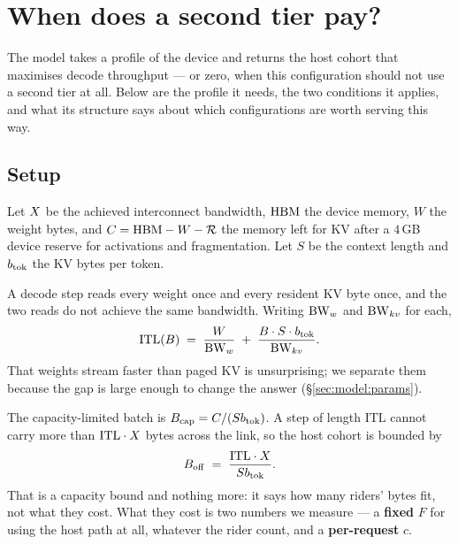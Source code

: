 %

\section{When does a second tier pay?}
\label{sec:model}

The model takes a profile of the device and returns the host cohort that maximises
decode throughput --- or zero, when this configuration should not use a second tier
at all. Below are the profile it needs, the two conditions it applies, and what its
structure says about which configurations are worth serving this way.

\subsection{Setup}

Let $X$ be the achieved interconnect bandwidth, $\mathrm{HBM}$ the device memory, $W$
the weight bytes, and $C = \mathrm{HBM} - W - \mathcal{R}$ the memory left for KV after a
$4$\,GB device reserve for activations and fragmentation. Let $S$ be the context
length and $b_{\mathrm{tok}}$ the KV bytes per token.

A decode step reads every weight once and every resident KV byte once, and the two
reads do not achieve the same bandwidth. Writing $\mathrm{BW}_w$ and $\mathrm{BW}_{kv}$ for each,
%
\begin{equation}
\label{eq:step}
\mathrm{ITL}(B) \;=\; \frac{W}{\mathrm{BW}_w} \;+\; \frac{B \cdot S \cdot b_{\mathrm{tok}}}{\mathrm{BW}_{kv}}.
\end{equation}
%
That weights stream faster than paged KV is unsurprising; we separate them
because the gap is large enough to change the answer (\S\ref{sec:model:params}).

The capacity-limited batch is $B_{\mathrm{cap}} = C/(Sb_{\mathrm{tok}})$. A step of length
$\mathrm{ITL}$ cannot carry more than $\mathrm{ITL}\cdot X$ bytes across the
link, so the host cohort is bounded by
%
\begin{equation}
\label{eq:boff}
B_{\mathrm{off}} \;=\; \frac{\mathrm{ITL} \cdot X}{S b_{\mathrm{tok}}}.
\end{equation}
%
That is a capacity bound and nothing more: it says how many riders' bytes fit, not
what they cost. What they cost is two numbers we measure --- a \textbf{fixed} $F$
for using the host path at all, whatever the rider count, and a
\textbf{per-request} $c$.

